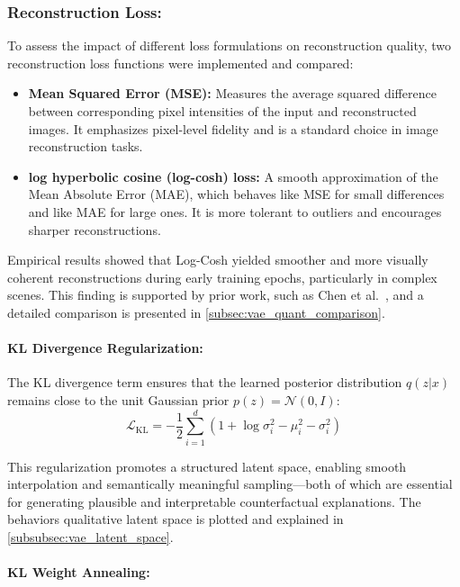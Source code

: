 \subsubsection{Reconstruction Loss:} \label{reconstruction_loss}

To assess the impact of different loss formulations on reconstruction quality, two reconstruction loss functions were implemented and compared:
\begin{itemize}
    \item \textbf{Mean Squared Error (MSE):} Measures the average squared difference between corresponding pixel intensities of the input and reconstructed images. It emphasizes pixel-level fidelity and is a standard choice in image reconstruction tasks.
    \item \textbf{log hyperbolic cosine (log-cosh) loss:} A smooth approximation of the Mean Absolute Error (MAE), which behaves like MSE for small differences and like MAE for large ones. It is more tolerant to outliers and encourages sharper reconstructions.
\end{itemize}

Empirical results showed that Log-Cosh yielded smoother and more visually coherent reconstructions during early training epochs, particularly in complex scenes. This finding is supported by prior work, such as Chen et al.~\cite{chen2019log}, and a detailed comparison is presented in \cref{subsec:vae_quant_comparison}.

\paragraph{KL Divergence Regularization:}

The KL divergence term ensures that the learned posterior distribution $q(z|x)$ remains close to the unit Gaussian prior $p(z) = \mathcal{N}(0, I)$:
\begin{equation}
    \mathcal{L}_{\text{KL}} = -\frac{1}{2} \sum_{i=1}^{d} \left(1 + \log\sigma_i^2 - \mu_i^2 - \sigma_i^2\right)
\end{equation}

This regularization promotes a structured latent space, enabling smooth interpolation and semantically meaningful sampling—both of which are essential for generating plausible and interpretable counterfactual explanations. The behaviors qualitative latent space is plotted and explained in \cref{subsubsec:vae_latent_space}.

\paragraph{KL Weight Annealing:}

